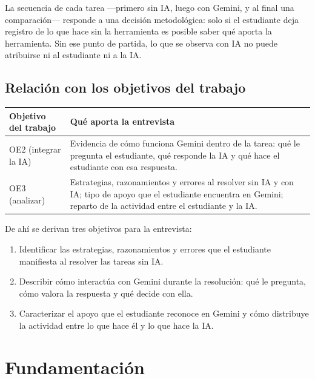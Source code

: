 \documentclass[11pt,letterpaper]{article}
\newcounter{preg}
\begin{document}
La secuencia de cada tarea ---primero sin IA, luego con Gemini, y al final una comparación--- responde a una decisión metodológica: solo si el estudiante deja registro de lo que hace sin la herramienta es posible saber qué aporta la herramienta. Sin ese punto de partida, lo que se observa con IA no puede atribuirse ni al estudiante ni a la IA.

\subsection*{Relación con los objetivos del trabajo}

\begin{center}
\small
\renewcommand{\arraystretch}{1.25}
\begin{tabularx}{\linewidth}{@{}p{2.6cm}L@{}}
\toprule
\textbf{Objetivo del trabajo} & \textbf{Qué aporta la entrevista}\\
\midrule
OE2 (integrar la IA) & Evidencia de cómo funciona Gemini dentro de la tarea: qué le pregunta el estudiante, qué responde la IA y qué hace el estudiante con esa respuesta.\\
OE3 (analizar) & Estrategias, razonamientos y errores al resolver sin IA y con IA; tipo de apoyo que el estudiante encuentra en Gemini; reparto de la actividad entre el estudiante y la IA.\\
\bottomrule
\end{tabularx}
\end{center}

\noindent De ahí se derivan tres objetivos para la entrevista:
\begin{enumerate}[label=\textbf{E\arabic*.}]
  \item Identificar las estrategias, razonamientos y errores que el estudiante manifiesta al resolver las tareas sin IA.
  \item Describir cómo interactúa con Gemini durante la resolución: qué le pregunta, cómo valora la respuesta y qué decide con ella.
  \item Caracterizar el apoyo que el estudiante reconoce en Gemini y cómo distribuye la actividad entre lo que hace él y lo que hace la IA.
\end{enumerate}

\section{Fundamentación}
\end{document}
